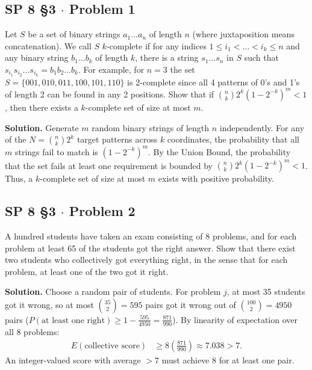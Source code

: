 \documentclass[11pt,a4paper]{article}
\begin{document}
\subsection{SP 8 \S3 $\cdot$ Problem 1}
\begin{tcolorbox}[title={SP 8 \S3 $\cdot$ Problem 1}]
Let $S$ be a set of binary strings $a_1 \dots a_n$ of length $n$ (where juxtaposition means concatenation). We call $S$ $k$-complete if for any indices $1 \le i_1 < \dots < i_k \le n$ and any binary string $b_1 \dots b_k$ of length $k$, there is a string $s_1 \dots s_n$ in $S$ such that $s_{i_1} s_{i_2} \dots s_{i_k} = b_1 b_2 \dots b_k$. For example, for $n = 3$ the set $S = \{001, 010, 011, 100, 101, 110\}$ is 2-complete since all 4 patterns of 0's and 1's of length 2 can be found in any 2 positions. Show that if $\binom{n}{k} 2^k \left(1 - 2^{-k}\right)^m < 1$, then there exists a $k$-complete set of size at most $m$.
\end{tcolorbox}

\noindent \textbf{Solution.} Generate $m$ random binary strings of length $n$ independently. For any of the $N = \binom{n}{k} 2^k$ target patterns across $k$ coordinates, the probability that all $m$ strings fail to match is $\left(1 - 2^{-k}\right)^m$. By the Union Bound, the probability that the set fails at least one requirement is bounded by $\binom{n}{k} 2^k \left(1 - 2^{-k}\right)^m < 1$. Thus, a $k$-complete set of size at most $m$ exists with positive probability.

\vspace{10pt}
\subsection{SP 8 \S3 $\cdot$ Problem 2}
\begin{tcolorbox}[title={SP 8 \S3 $\cdot$ Problem 2}]
A hundred students have taken an exam consisting of 8 problems, and for each problem at least 65 of the students got the right answer. Show that there exist two students who collectively got everything right, in the sense that for each problem, at least one of the two got it right.
\end{tcolorbox}

\noindent \textbf{Solution.} Choose a random pair of students. For problem $j$, at most 35 students got it wrong, so at most $\binom{35}{2} = 595$ pairs got it wrong out of $\binom{100}{2} = 4950$ pairs ($P(\text{at least one right}) \ge 1 - \frac{595}{4950} = \frac{871}{990}$). By linearity of expectation over all 8 problems:
\begin{align*}
E(\text{collective score}) &\ge 8 \left(\frac{871}{990}\right) \approx 7.038 > 7.
\end{align*}
An integer-valued score with average $>7$ must achieve 8 for at least one pair.
\end{document}
